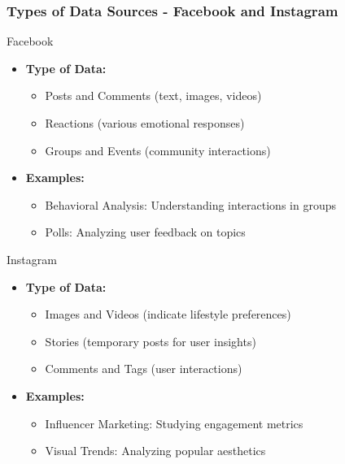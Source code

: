 \documentclass{beamer}
\begin{document}
\begin{frame}[fragile]
    \frametitle{Types of Data Sources - Facebook and Instagram}
    \begin{block}{Facebook}
        \begin{itemize}
            \item \textbf{Type of Data:}
            \begin{itemize}
                \item Posts and Comments (text, images, videos)
                \item Reactions (various emotional responses)
                \item Groups and Events (community interactions)
            \end{itemize}
            \item \textbf{Examples:}
            \begin{itemize}
                \item Behavioral Analysis: Understanding interactions in groups
                \item Polls: Analyzing user feedback on topics
            \end{itemize}
        \end{itemize}
    \end{block}

    \begin{block}{Instagram}
        \begin{itemize}
            \item \textbf{Type of Data:}
            \begin{itemize}
                \item Images and Videos (indicate lifestyle preferences)
                \item Stories (temporary posts for user insights)
                \item Comments and Tags (user interactions)
            \end{itemize}
            \item \textbf{Examples:}
            \begin{itemize}
                \item Influencer Marketing: Studying engagement metrics
                \item Visual Trends: Analyzing popular aesthetics
            \end{itemize}
        \end{itemize}
    \end{block}
\end{frame}
\end{document}
